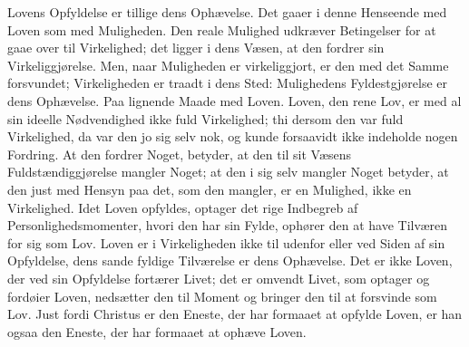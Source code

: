 \documentclass[12pt]{book}
\begin{document}
Lovens Opfyldelse er tillige dens Ophævelse. Det gaaer i denne
Henseende med Loven som med Muligheden. Den reale Mulighed udkræver
Betingelser for at gaae over til Virkelighed; det ligger i dens
Væsen, at den fordrer sin Virkeliggjørelse. Men, naar Muligheden er
virkeliggjort, er den med det Samme forsvundet; Virkeligheden er
traadt i dens Sted: Mulighedens Fyldestgjørelse er dens Ophævelse.
Paa lignende Maade med Loven. Loven, den rene Lov, er med al sin
ideelle Nødvendighed ikke fuld Virkelighed; thi dersom den var fuld
Virkelighed, da var den jo sig selv nok, og kunde forsaavidt ikke
indeholde nogen Fordring. At den fordrer Noget, betyder, at den til
sit Væsens Fuldstændiggjørelse mangler Noget; at den i sig selv
mangler Noget betyder,
at den just med Hensyn paa det, som den mangler, er en Mulighed,
ikke en Virkelighed. Idet Loven opfyldes, optager det rige Indbegreb
af Personlighedsmomenter, hvori den har sin Fylde, ophører den at
have Tilværen for sig som Lov. Loven er i Virkeligheden ikke til
udenfor eller ved Siden af sin Opfyldelse, dens sande fyldige
Tilværelse er dens Ophævelse. Det er ikke Loven, der ved sin
Opfyldelse fortærer Livet; det er omvendt Livet, som optager og
fordøier Loven, nedsætter den til Moment og bringer den til at
forsvinde som Lov. Just fordi Christus er den Eneste, der har
formaaet at opfylde Loven, er han ogsaa den Eneste, der har formaaet
at ophæve Loven.
\end{document}
